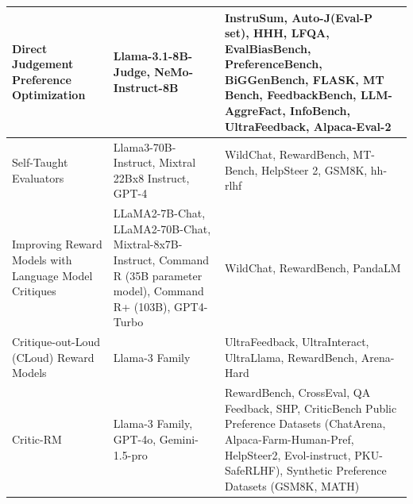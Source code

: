 \begin{table}[t]
\begin{tabular}{|p{4cm}|p{4cm}|p{8cm}|}
        \hline
        Direct Judgement Preference Optimization \autocite{wang2024directjudgementpreferenceoptimization}                           & Llama-3.1-8B-Judge, NeMo-Instruct-8B                                                                                   & InstruSum, Auto-J(Eval-P set), HHH, LFQA, EvalBiasBench, PreferenceBench, BiGGenBench, FLASK, MT Bench, FeedbackBench, LLM-AggreFact, InfoBench, UltraFeedback, Alpaca-Eval-2                                                \\
        \hline
        Self-Taught Evaluators \autocite{wang2024selftaughtevaluators}                                                              & Llama3-70B-Instruct, Mixtral 22Bx8 Instruct, GPT-4                                                                     & WildChat, RewardBench, MT-Bench, HelpSteer 2, GSM8K, hh-rlhf                                                                                                                                                                 \\
        \hline
        Improving Reward Models with Language Model Critiques \autocite{ye2024improvingrewardmodelssynthetic}                       & LLaMA2-7B-Chat, LLaMA2-70B-Chat, Mixtral-8x7B-Instruct, Command R (35B parameter model), Command R+ (103B), GPT4-Turbo & WildChat, RewardBench, PandaLM                                                                                                                                                                                               \\
        \hline
        Critique-out-Loud (CLoud) Reward Models \autocite{ankner2024critiqueoutloudrewardmodels}                                    & Llama-3 Family                                                                                                         & UltraFeedback, UltraInteract, UltraLlama, RewardBench, Arena-Hard                                                                                                                                                            \\
        \hline
        Critic-RM \autocite{yu2025selfgeneratedcritiquesboostreward}                                                                & Llama-3 Family, GPT-4o, Gemini-1.5-pro                                                                                 & RewardBench, CrossEval, QA Feedback, SHP, CriticBench \newline Public Preference Datasets (ChatArena, Alpaca-Farm-Human-Pref, HelpSteer2, Evol-instruct, PKU-SafeRLHF), \newline Synthetic Preference Datasets (GSM8K, MATH) \\

        \hline
    \end{tabular}
\end{table}